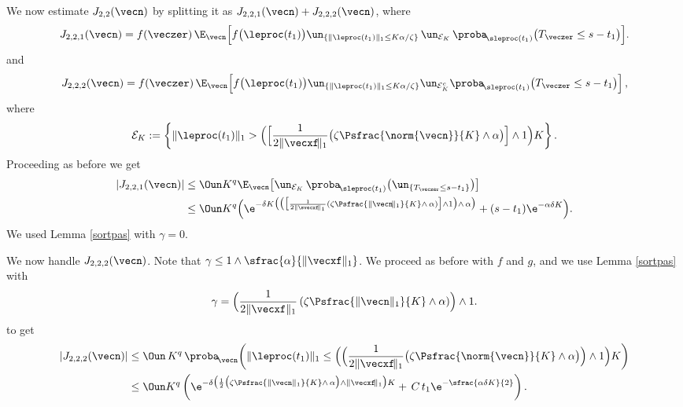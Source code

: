We now estimate $J_{2,2}(\vecn)$ by splitting it as
$J_{2,2,1}(\vecn)+J_{2,2,2}(\vecn)$, where
\[
J_{2,2,1}(\vecn)=f(\veczer)\,\E_{\vecn}\Bigl[f\bigl(\leproc(t_{1})\bigr) \un_{\left\{\|\leproc(t_1)\|_1\leq K\alpha/\zeta\right\}} \,
\un_{\mathcal{E}_K}\,\proba_{\!\sleproc(t_{1}) } \bigl(T_{\veczer} \leq s-t_1\bigr)\Bigr].
\]
and
\[
J_{2,2,2}(\vecn)= f(\veczer)\,
\E_{\vecn}\!\left[
f\bigl(\leproc(t_{1})\bigr) \un_{\left\{\|\leproc(t_1)\|_1\leq K\alpha/\zeta\right\}}
\un_{\mathcal{E}_K^c}\proba_{\!\sleproc(t_{1}) } \bigl(T_{\veczer} \leq s-t_1\bigr)\right],
\]
where
\[
\mathcal{E}_K:=\left\{\|\leproc(t_1)\|_1 > \Bigl(\Bigl[\frac{1}{2\|\vecxf\!\|_1}
\bigl(\zeta\Psfrac{\norm{\vecn}}{K}\wedge \alpha\bigr)\Bigr]\wedge 1\Bigr){K}\right\}.
\]
Proceeding as before we get
\begin{align*}
|J_{2,2,1}(\vecn)|
& \leq \Oun K^{q}\E_{\vecn}\bigl[
\un_{\mathcal{E}_K}\,\proba_{\!\sleproc(t_{1}) } \bigl(\un_{\{T_{\veczer} \leq s-t_1\}}\bigr)\bigr]\\
& \leq \Oun K^{q}
\Bigl(\e^{-\delta K \bigl(\bigl(\bigl[\frac{1}{2\|\svecxf\!\|_{1}}(\zeta\Psfrac{\|\vecn\!\|_{1}}{K}\wedge\, \alpha)\bigr]\wedge 1\bigr)\wedge\, \alpha \bigr)}+(s-t_1) \e^{-\alpha\delta K}\Bigr).
\end{align*}
We used Lemma \ref{sortpas} with $\gamma=0$.

We now handle $J_{2,2,2}(\vecn)$. Note that $\gamma\leq 1\wedge \sfrac{\alpha}{\|\vecxf\|_{1}}$.
We proceed as before with $f$ and $g$, and we use Lemma \ref{sortpas} with
\[
\gamma= \Bigl(\frac{1}{2\|\vecxf\|_1} \left(\zeta\Psfrac{\|\vecn\|_1}{K}\wedge \alpha\right) \Bigr)\wedge 1.
\]
to get
\begin{align*}
|J_{2,2,2}(\vecn)|
& \leq \Oun\, K^{q}\,\proba_{\!\vecn} \biggl(
\|\leproc(t_1)\|_1 \le \Bigl(\Bigl(\frac{1}{2\|\vecxf\!\|_1}
\bigl(\zeta\Psfrac{\norm{\vecn}}{K}\wedge \alpha\bigr) \Bigr)\wedge 1 \Bigr){K} \biggr)\\
& \leq \Oun K^q
\left(\e^{-{\delta} \bigl(\frac{1}{2} \bigl(\zeta\Psfrac{\|\vecn\|_{1}}{K}\wedge\, \alpha\bigr)\wedge \|\vecxf\!\|_1\bigr)K}
+\, C\, t_1 \e^{-\sfrac{\alpha\delta K}{2}}\right).
\end{align*}

